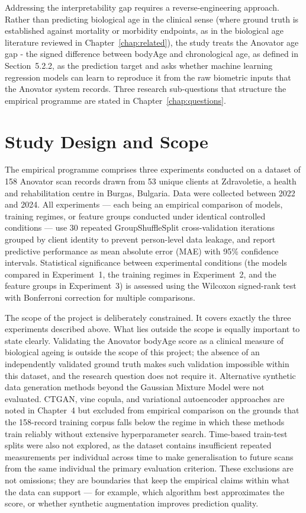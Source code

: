 \documentclass[11pt,a4paper]{report}
\begin{document}
Addressing the interpretability gap requires a reverse-engineering approach. Rather than
predicting biological age in the clinical sense (where ground truth is established against mortality
or morbidity endpoints, as in the biological age literature reviewed in
Chapter~\ref{chap:related}), the study treats the Anovator age gap - the signed difference between bodyAge and chronological
age, as defined in Section~5.2.2, as the prediction target and asks whether machine learning
regression models can learn to reproduce it from the raw biometric inputs that the Anovator system
records. Three research
sub-questions that structure the empirical programme are stated in
Chapter~\ref{chap:questions}.

\section{Study Design and Scope}

The empirical programme comprises three experiments conducted on a dataset of 158 Anovator scan
records drawn from 53 unique clients at Zdravoletie, a health and rehabilitation centre in Burgas,
Bulgaria. Data were collected between 2022 and 2024. All experiments --- each being an empirical comparison of models, training regimes, or feature groups conducted under identical controlled conditions --- use 30 repeated
GroupShuffleSplit cross-validation iterations grouped by client identity to prevent person-level data
leakage, and report predictive performance as mean absolute error (MAE) with 95\% confidence intervals. Statistical significance between experimental conditions (the models compared in Experiment~1, the training regimes in Experiment~2, and the feature groups in Experiment~3) is assessed using the Wilcoxon signed-rank test with Bonferroni correction for multiple comparisons.

The scope of the project is deliberately constrained. It covers exactly the three experiments
described above. What lies outside the scope is equally important to state clearly. Validating the Anovator bodyAge score as a clinical measure of biological ageing is outside the
scope of this project; the absence of an independently validated ground truth makes such validation
impossible within this dataset, and the research question does not require it. Alternative synthetic data generation methods beyond the Gaussian Mixture Model were not evaluated. CTGAN, vine copula, and
variational autoencoder approaches are noted in Chapter~4 but excluded from empirical
comparison on the grounds that the 158-record training corpus falls below the regime in which these
methods train reliably without extensive hyperparameter search. Time-based train-test splits were also not explored, as the dataset contains insufficient repeated measurements per individual across time to make generalisation to future scans from the same individual the primary evaluation criterion. These exclusions are
not omissions; they are boundaries that keep the empirical claims within what the data can support --- for example, which algorithm best approximates the score, or whether synthetic augmentation improves prediction quality.
\end{document}
